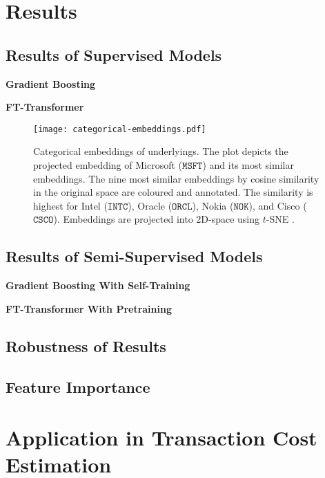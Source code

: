 \newpage
\section{Results}\label{sec:results}


\subsection{Results of Supervised
    Models}\label{sec:results-of-supervised-models}

\textbf{Gradient Boosting}

\textbf{FT-Transformer}

\begin{figure}[ht]
    \centering
    \texttt{[image: categorical-embeddings.pdf]}
    \caption[Categorical Embeddings of Underlyings]{Categorical embeddings of underlyings. The plot depicts the projected embedding of Microsoft ($\mathtt{MSFT}$) and its most similar embeddings. The nine most similar embeddings by cosine similarity in the original space are coloured and annotated. The similarity is highest for Intel ($\mathtt{INTC}$), Oracle ($\mathtt{ORCL}$), Nokia ($\mathtt{NOK}$), and Cisco ($\mathtt{CSCO}$). Embeddings are projected into 2D-space using $t$-SNE \autocite{vandermaatenVisualizingDataUsing2008}.}
    \label{fig:categorical-embeddings}
\end{figure}

\subsection{Results of Semi-Supervised
    Models}\label{sec:results-of-semi-supervised-models}


\textbf{Gradient Boosting With Self-Training}

\textbf{FT-Transformer With Pretraining}

\subsection{Robustness of Results}\label{sec:robustness-checks}

\subsection{Feature Importance}\label{sec:feature-importance}

\newpage
\section{Application in Transaction Cost Estimation}\label{sec:application}

